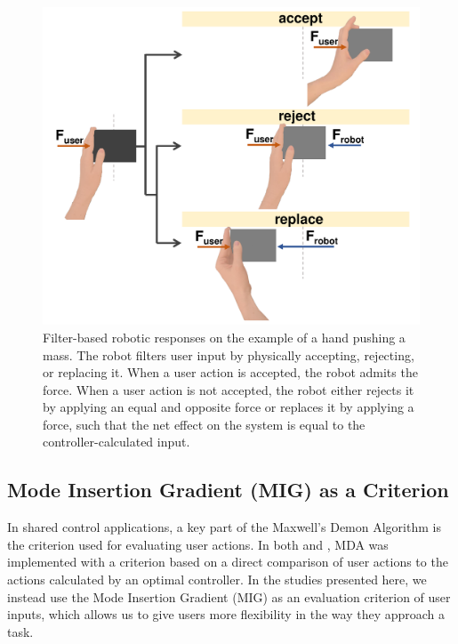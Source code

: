 \begin{figure}[h]
\centering
\includegraphics[width=0.7\columnwidth]{MDAconcept.pdf}
\caption{Filter-based robotic responses on the example of a hand pushing a mass. The robot filters user input by physically accepting, rejecting, or replacing it. When a user action is accepted, the robot admits the force. When a user action is not accepted, the robot either rejects it by applying an equal and opposite force or replaces it by applying a force, such that the net effect on the system is equal to the controller-calculated input. }
\label{fig: accept_reject_replace}
\end{figure}



\subsection{Mode Insertion Gradient (MIG) as a Criterion}
\label{criterion}

In shared control applications, a key part of the Maxwell's Demon Algorithm is the criterion used for evaluating user actions. In both \cite{MDA_Emmanouil} and \cite{MDA_Katie}, MDA was implemented with a criterion based on a direct comparison of user actions to the actions calculated by an optimal controller. In the studies presented here, we instead use the Mode Insertion Gradient (MIG) as an evaluation criterion of user inputs, which allows us to give users more flexibility in the way they approach a task. 

